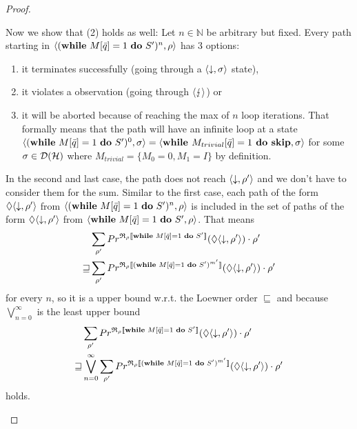 \documentclass[a4paper,UKenglish,cleveref, autoref, thm-restate]{lipics-v2021}
\begin{document}
\begin{proof}
\begin{enumerate}
\begin{itemize}
\begin{enumerate}
        Now we show that (2) holds as well:
        Let $n\in \mathbb{N}$ be arbitrary but fixed. Every path starting in $\langle (\mathbf{while } \text{ }M[\Bar{q}]=1 \text{ }\mathbf{ do } \text{ }S')^n , \rho \rangle$ has $3$ options:
        \begin{enumerate}
            \item it terminates successfully (going through a $\langle \downarrow , \sigma \rangle$ state),
            \item it violates a observation (going through $\langle \lightning \rangle$) or
            \item it will be aborted because of reaching the max of $n$ loop iterations. That formally means that the path will have an infinite loop at a state $\langle (\mathbf{while } \text{ }M[\Bar{q}]=1 \text{ }\mathbf{ do } \text{ }S')^0 , \sigma \rangle= \langle \textbf{while } M_{trivial}[\Bar{q}]=1 \textbf{ do } \mathbf{skip} , \sigma \rangle$ for some $\sigma \in \mathcal{D}(\mathcal{H})$ where $M_{trivial}=\{M_0=0, M_1=I\}$ by definition.
        \end{enumerate}
         In the second and last case, the path does not reach $\langle \downarrow , \rho' \rangle$ and we don't have to consider them for the sum. Similar to the first case, each path of the form $\lozenge \langle \downarrow , \rho' \rangle$ from $\langle (\mathbf{while } \text{ }M[\Bar{q}]=1 \text{ }\mathbf{ do } \text{ }S')^n , \rho \rangle$ is included in the set of paths of the form $\lozenge \langle \downarrow , \rho' \rangle$ from $\langle \mathbf{while } \text{ }M[\Bar{q}]=1 \text{ }\mathbf{ do } \text{ }S' , \rho \rangle$. That means
        \begin{align*}
            &\sum_{\rho'} Pr^{\mathfrak{R}_{\rho}\llbracket \mathbf{while } \text{ }M[\Bar{q}]=1 \text{ }\mathbf{ do } \text{ }S' \rrbracket}(\lozenge \langle \downarrow , \rho' \rangle) \cdot \rho'
            \\\sqsupseteq & \sum_{\rho'} Pr^{\mathfrak{R}_{\rho}\llbracket (\mathbf{while } \text{ }M[\Bar{q}]=1 \text{ }\mathbf{ do } \text{ }S')^{m'} \rrbracket}(\lozenge \langle \downarrow , \rho' \rangle) \cdot \rho'
        \end{align*}
        for every $n$, so it is a upper bound w.r.t. the Loewner order $\sqsubseteq$ and because $\bigvee_{n=0}^\infty$ is the least upper bound
        \begin{align*}
            &\sum_{\rho'} Pr^{\mathfrak{R}_{\rho}\llbracket \mathbf{while } \text{ }M[\Bar{q}]=1 \text{ }\mathbf{ do } \text{ }S' \rrbracket}(\lozenge \langle \downarrow , \rho' \rangle) \cdot \rho'
            \\ \sqsupseteq &\bigvee_{n=0}^\infty \sum_{\rho'} Pr^{\mathfrak{R}_{\rho}\llbracket (\mathbf{while } \text{ }M[\Bar{q}]=1 \text{ }\mathbf{ do } \text{ }S')^{m'} \rrbracket}(\lozenge \langle \downarrow , \rho' \rangle) \cdot \rho'
        \end{align*}
        holds.


\end{enumerate}
\end{itemize}
\end{enumerate}
\end{proof}
\end{document}
